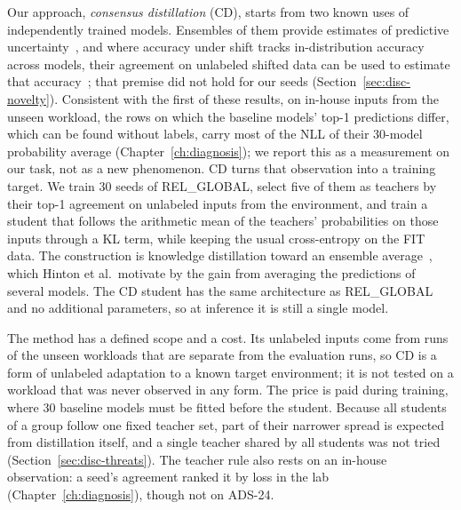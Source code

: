 Our approach, \emph{consensus distillation} (CD), starts
from two known uses of independently trained models. Ensembles of them
provide estimates of predictive
uncertainty~\cite{lakshminarayanan2016simple}, and where accuracy under shift tracks in-distribution accuracy across
models, their agreement on unlabeled shifted data can be used to
estimate that accuracy~\cite{baek2022agreement}; that premise did not
hold for our seeds (Section~\ref{sec:disc-novelty}).
Consistent with
the first of these results, on in-house inputs from the unseen workload, the rows on
which the baseline models' top-1 predictions differ, which can be found
without labels, carry most of the NLL of
their 30-model probability average (Chapter~\ref{ch:diagnosis}); we
report this as a measurement on our task, not as a new phenomenon. CD turns that observation into a
training target. We train 30 seeds of
REL\_GLOBAL, select five of them as teachers by their top-1 agreement on
unlabeled inputs from the environment, and train a student that follows
the arithmetic mean of the teachers' probabilities on those inputs
through a KL term, while keeping the usual cross-entropy on the FIT
data. The construction is knowledge distillation toward an ensemble
average~\cite{hinton2015distilling}, which Hinton et al.\ motivate by
the gain from averaging the predictions of several models.
The CD student has the same
architecture as REL\_GLOBAL and no additional parameters, so at
inference it is still a single model.

The method has a defined scope and a cost. Its unlabeled inputs come
from runs of the unseen workloads that are separate from the evaluation
runs, so CD is a form of unlabeled adaptation to a known target
environment; it is not tested on a workload that was never observed in
any form. The price is paid during training, where 30 baseline models
must be fitted before the student. Because all students of a group
follow one fixed teacher set, part of their narrower spread is expected
from distillation itself, and a single teacher shared by all students
was not tried (Section~\ref{sec:disc-threats}). The teacher rule also
rests on an in-house observation: a seed's agreement ranked it by loss
in the lab (Chapter~\ref{ch:diagnosis}), though not on ADS-24.

